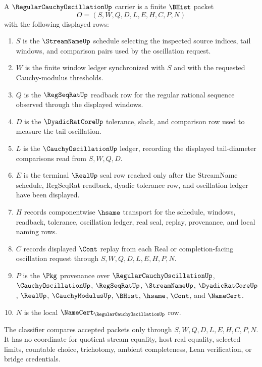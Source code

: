 \begin{definition}
\label{def:regular-cauchy-oscillation-carrier}
A $\RegularCauchyOscillationUp$ carrier is a finite $\BHist$ packet
$$
O=(S,W,Q,D,L,E,H,C,P,N)
$$
with the following displayed rows:
\begin{enumerate}
\item $S$ is the $\StreamNameUp$ schedule selecting the inspected source indices, tail windows, and comparison pairs used by the oscillation request.
\item $W$ is the finite window ledger synchronized with $S$ and with the requested Cauchy-modulus thresholds.
\item $Q$ is the $\RegSeqRatUp$ readback row for the regular rational sequence observed through the displayed windows.
\item $D$ is the $\DyadicRatCoreUp$ tolerance, slack, and comparison row used to measure the tail oscillation.
\item $L$ is the $\CauchyOscillationUp$ ledger, recording the displayed tail-diameter comparisons read from $S,W,Q,D$.
\item $E$ is the terminal $\RealUp$ seal row reached only after the StreamName schedule, RegSeqRat readback, dyadic tolerance row, and oscillation ledger have been displayed.
\item $H$ records componentwise $\hsame$ transport for the schedule, windows, readback, tolerance, oscillation ledger, real seal, replay, provenance, and local naming rows.
\item $C$ records displayed $\Cont$ replay from each Real or completion-facing oscillation request through $S,W,Q,D,L,E,H,P,N$.
\item $P$ is the $\Pkg$ provenance over $\RegularCauchyOscillationUp$, $\CauchyOscillationUp$, $\RegSeqRatUp$, $\StreamNameUp$, $\DyadicRatCoreUp$, $\RealUp$, $\CauchyModulusUp$, $\BHist$, $\hsame$, $\Cont$, and $\NameCert$.
\item $N$ is the local $\NameCert_{\RegularCauchyOscillationUp}$ row.
\end{enumerate}
The classifier compares accepted packets only through $S,W,Q,D,L,E,H,C,P,N$. It has no coordinate for quotient stream equality, host real equality, selected limits, countable choice, trichotomy, ambient completeness, Lean verification, or bridge credentials.
\end{definition}

